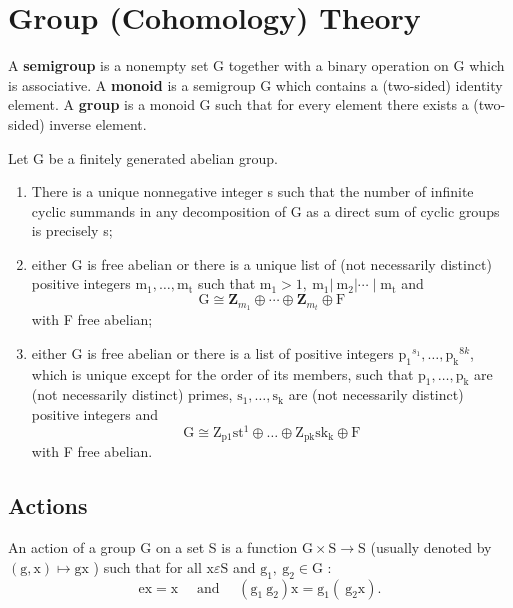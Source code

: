 
\chapter{Group (Cohomology) Theory} 

A \textbf{semigroup} is a nonempty set G together with a binary operation on G which is associative. A \textbf{monoid} is a semigroup G which contains a (two-sided) identity element. A \textbf{group} is a monoid G such that for every element there exists a (two-sided) inverse element.

\begin{theo}
Let G be a finitely generated abelian group.
    \begin{enumerate}
        \item There is a unique nonnegative integer s such that the number of infinite cyclic summands in any decomposition of G as a direct sum of cyclic groups is precisely s;
        \item either G is free abelian or there is a unique list of (not necessarily distinct) positive integers $\mathrm{m}_1, \ldots, \mathrm{m}_{\mathrm{t}}$ such that $\mathrm{m}_1>1, \mathrm{~m}_1\left|\mathrm{~m}_2\right| \cdots \mid \mathrm{m}_{\mathrm{t}}$ and
        $$
        \mathrm{G} \cong \mathbf{Z}_{m_1} \oplus \cdots \oplus \mathbf{Z}_{m_t} \oplus \mathrm{F}
        $$
        with F free abelian;
        \item either G is free abelian or there is a list of positive integers $\mathrm{p}_1{ }^{s_1}, \ldots, \mathrm{p}_{\mathrm{k}}{ }^{8 k}$, which is unique except for the order of its members, such that $\mathrm{p}_1, \ldots, \mathrm{p}_{\mathrm{k}}$ are (not necessarily distinct) primes, $\mathrm{s}_1, \ldots, \mathrm{s}_{\mathrm{k}}$ are (not necessarily distinct) positive integers and
        $$
        \mathrm{G} \cong \mathrm{Z}_{\mathrm{p} 1} \mathrm{st}^1 \oplus \ldots \oplus \mathrm{Z}_{\mathrm{pk}} \mathrm{sk}_{\mathrm{k}} \oplus \mathrm{F}
        $$
        with F free abelian.
    \end{enumerate}
\end{theo}



\section{Actions}

\cite{brownCohomologyGroups1982} An action of a group G on a set S is a function $\mathrm{G} \times \mathrm{S} \rightarrow \mathrm{S}$ (usually denoted by $(\mathrm{g}, \mathrm{x}) \mapsto \mathrm{gx}$ ) such that for all $\mathrm{x} \varepsilon \mathrm{S}$ and $\mathrm{g}_1, \mathrm{~g}_2 \in \mathrm{G}$ :
$$
\mathrm{ex}=\mathrm{x} \quad \text { and } \quad\left(\mathrm{g}_1 \mathrm{~g}_2\right) \mathrm{x}=\mathrm{g}_1\left(\mathrm{~g}_2 \mathrm{x}\right) .
$$

